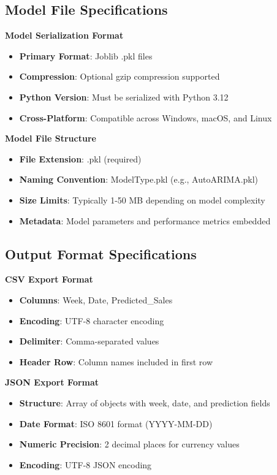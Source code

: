 \subsection{Model File Specifications}

\textbf{Model Serialization Format}
\begin{itemize}
	\item \textbf{Primary Format}: Joblib .pkl files
	\item \textbf{Compression}: Optional gzip compression supported
	\item \textbf{Python Version}: Must be serialized with Python 3.12
	\item \textbf{Cross-Platform}: Compatible across Windows, macOS, and Linux
\end{itemize}

\textbf{Model File Structure}
\begin{itemize}
	\item \textbf{File Extension}: .pkl (required)
	\item \textbf{Naming Convention}: ModelType.pkl (e.g., AutoARIMA.pkl)
	\item \textbf{Size Limits}: Typically 1-50 MB depending on model complexity
	\item \textbf{Metadata}: Model parameters and performance metrics embedded
\end{itemize}

\subsection{Output Format Specifications}

\textbf{CSV Export Format}
\begin{itemize}
	\item \textbf{Columns}: Week, Date, Predicted\_Sales
	\item \textbf{Encoding}: UTF-8 character encoding
	\item \textbf{Delimiter}: Comma-separated values
	\item \textbf{Header Row}: Column names included in first row
\end{itemize}

\textbf{JSON Export Format}
\begin{itemize}
	\item \textbf{Structure}: Array of objects with week, date, and prediction fields
	\item \textbf{Date Format}: ISO 8601 format (YYYY-MM-DD)
	\item \textbf{Numeric Precision}: 2 decimal places for currency values
	\item \textbf{Encoding}: UTF-8 JSON encoding
\end{itemize}

